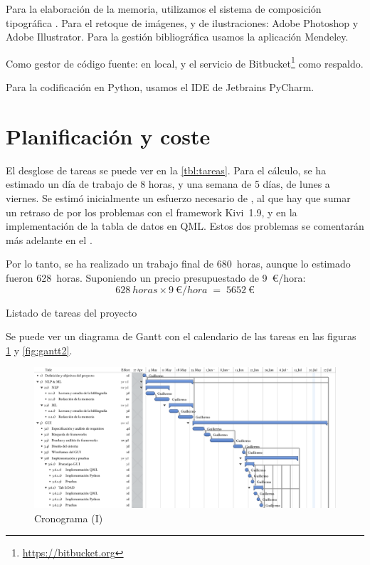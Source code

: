 Para la elaboración de la memoria, utilizamos el sistema de composición tipográfica \XeLaTeX. Para el retoque de imágenes, y de ilustraciones: Adobe Photoshop y Adobe Illustrator. Para la gestión bibliográfica usamos la aplicación Mendeley.

Como gestor de código fuente:  en local, y el servicio de Bitbucket\footnote{\url{https://bitbucket.org}} como respaldo.

Para la codificación en Python, usamos el IDE de Jetbrains PyCharm.

\section{Planificación y coste}

El desglose de tareas se puede ver en la \autoref{tbl:tareas}. Para el cálculo, se ha estimado un día de trabajo de 8 horas, y una semana de 5 días, de lunes a viernes. Se estimó inicialmente un esfuerzo necesario de , al que hay que sumar un retraso de  por los problemas con el framework Kivi~1.9, y en la implementación de la tabla de datos en QML. Estos dos problemas se comentarán más adelante en el .

Por lo tanto, se ha realizado un trabajo final de \SI{680}{horas}, aunque lo estimado fueron \SI{628}{horas}. Suponiendo un precio presupuestado de \SI{9}{€/hora}:
\[
\SI{628}{horas} \times \SI{9}{€/hora} \; = \; \SI{5652}{€} 
\]

\begin{table}[htbp]
\centering
{}
\caption{Listado de tareas del proyecto}
\label{tbl:tareas}
\end{table}

Se puede ver un diagrama de Gantt con el calendario de las tareas en las figuras \ref{fig:gantt1} y \ref{fig:gantt2}.

\begin{landscape}
\begin{figure}[htbp]
\centering
\vspace*{0.6cm}
\includegraphics[width=24cm]{gantt1}
\caption{Cronograma (I)}
\label{fig:gantt1}
\end{figure}
\end{landscape}


